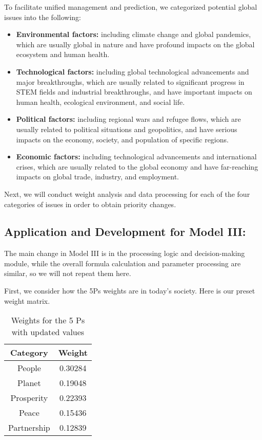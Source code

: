 To facilitate unified management and prediction, we categorized potential global issues into the following:

\begin{itemize}
\item \textbf{Environmental factors:} including climate change and global pandemics, which are usually global in nature and have profound impacts on the global ecosystem and human health.
\item \textbf{Technological factors:} including global technological advancements and major breakthroughs, which are usually related to significant progress in STEM fields and industrial breakthroughs, and have important impacts on human health, ecological environment, and social life.
\item \textbf{Political factors:} including regional wars and refugee flows, which are usually related to political situations and geopolitics, and have serious impacts on the economy, society, and population of specific regions.
\item \textbf{Economic factors:} including technological advancements and international crises, which are usually related to the global economy and have far-reaching impacts on global trade, industry, and employment.
\end{itemize}

Next, we will conduct weight analysis and data processing for each of the four categories of issues in order to obtain priority changes.

\subsection{Application and Development for Model III:}

The main change in Model III is in the processing logic and decision-making module, while the overall formula calculation and parameter processing are similar, so we will not repeat them here.

First, we consider how the 5Ps weights are in today's society. Here is our preset weight matrix.



\begin{table}[h]
\centering
\begin{tabular}{|c|c|}
  \hline
  Category & Weight \\
  \hline
  People & 0.30284 \\
  Planet & 0.19048 \\
  Prosperity & 0.22393 \\
  Peace & 0.15436 \\
  Partnership & 0.12839 \\
  \hline
\end{tabular}
\caption{Weights for the 5 Ps with updated values}
\label{tab:updated_weights}
\end{table}

